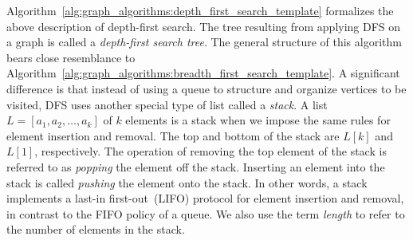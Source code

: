 %
%

Algorithm~\ref{alg:graph_algorithms:depth_first_search_template}
formalizes the above description of depth-first search. The tree
resulting from applying DFS on a graph is called a
\emph{depth-first search tree}. The general structure of this
algorithm bears close resemblance to
Algorithm~\ref{alg:graph_algorithms:breadth_first_search_template}. A
significant difference is that instead of using a queue to structure
and organize vertices to be visited, DFS uses another special type of
list called a \emph{stack}. A list $L = [a_1, a_2, \dots, a_k]$ of $k$
elements is a stack when we impose the same rules for element
insertion and removal. The top and bottom of the stack are $L[k]$ and
$L[1]$, respectively. The operation of removing the top element of the
stack is referred to as \emph{popping} the element off the
stack. Inserting an element into the stack is called \emph{pushing}
the element onto the stack. In other words, a stack implements a
last-in first-out~(LIFO) protocol for element insertion and removal,
in contrast to the FIFO policy of a queue. We also use the term
\emph{length} to refer to the number of elements in the stack.


